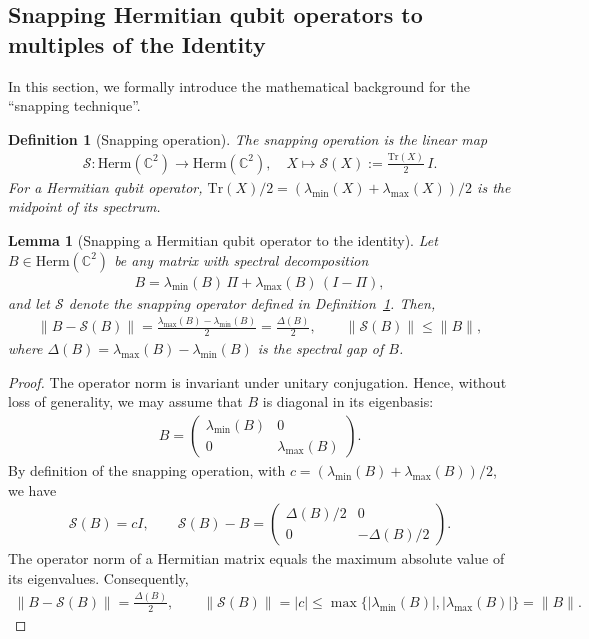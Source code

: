 \documentclass[a4paper,onecolumn,11pt]{quantumarticle}
\theoremstyle{plain}
\newtheorem{lemma}[theorem]{Lemma}
\newtheorem{definition}[theorem]{Definition}
\begin{document}
\subsection{Snapping Hermitian qubit operators to multiples of the Identity}

In this section, we formally introduce the mathematical background for the ``snapping technique''.

\begin{definition}[Snapping operation]\label{def:snapping-operator}
The snapping operation is the linear map
\begin{align}
\mathcal{S} : \mathrm{Herm}(\mathbb{C}^{2}) \rightarrow \mathrm{Herm}(\mathbb{C}^{2}),
\quad X \mapsto \mathcal{S}(X) := \frac{\mathrm{Tr}(X)}{2}\,I.
\end{align}
For a Hermitian qubit operator, $\mathrm{Tr}(X)/2=(\lambda_{\min}(X)+\lambda_{\max}(X))/2$ is the midpoint of its spectrum.
\end{definition}
\begin{lemma}[Snapping a Hermitian qubit operator to the identity]\label{lemma:snapping-hermitian-qubit-hermitian-operator}
Let $B \in \mathrm{Herm}(\mathbb{C}^{2})$ be any matrix with spectral decomposition
\begin{align}
B = \lambda_{\min}(B)\,\Pi + \lambda_{\max}(B)\,(I-\Pi),
\end{align}
and let $\mathcal{S}$ denote the snapping operator defined in Definition~\ref{def:snapping-operator}. Then,
\begin{align}
\|B - \mathcal{S}(B)\|
= \frac{\lambda_{\max}(B) - \lambda_{\min}(B)}{2}
= \frac{\Delta(B)}{2},
\qquad \|\mathcal{S}(B)\|\leq\|B\|,
\end{align}
where $\Delta(B) = \lambda_{\max}(B) - \lambda_{\min}(B)$ is the spectral gap of $B$.
\end{lemma}

\begin{proof}
The operator norm is invariant under unitary conjugation. Hence, without loss of generality, we may assume that $B$ is diagonal in its eigenbasis:
\begin{align}
B =
\begin{pmatrix}
\lambda_{\min}(B) & 0 \\
0 & \lambda_{\max}(B)
\end{pmatrix}.
\end{align}
By definition of the snapping operation, with $c=(\lambda_{\min}(B)+\lambda_{\max}(B))/2$, we have
\begin{align}
\mathcal{S}(B) = cI,
\qquad
\mathcal{S}(B)-B =
\begin{pmatrix}
\Delta(B)/2 & 0 \\
0 & -\Delta(B)/2
\end{pmatrix}.
\end{align}
The operator norm of a Hermitian matrix equals the maximum absolute value of its eigenvalues. Consequently,
\begin{align}
\|B-\mathcal{S}(B)\|=\frac{\Delta(B)}{2},
\qquad
\|\mathcal{S}(B)\|=|c|
\leq\max\{|\lambda_{\min}(B)|,|\lambda_{\max}(B)|\}=\|B\|.
\end{align}
\end{proof}
\end{document}
